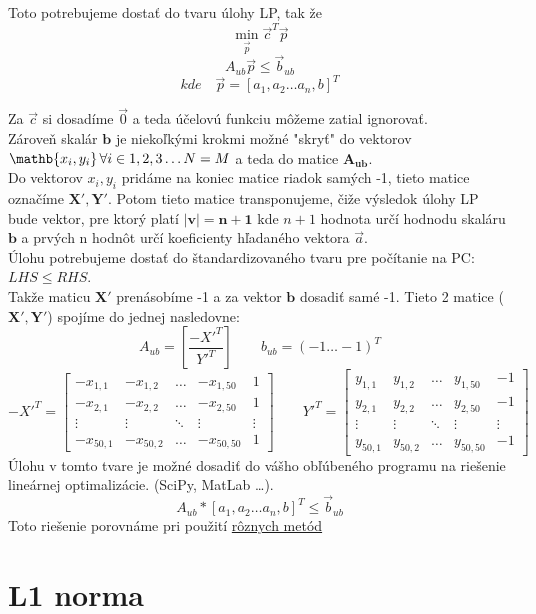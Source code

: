 \documentclass{article}
\begin{document}
Toto potrebujeme dostať do tvaru úlohy LP, tak že
\[\min_{\Vec{p}} \Vec{c} ^ T \Vec{p}\]
\[A_{ub} \Vec{p} \leq \Vec{b}_{ub}\]
\[kde \quad \Vec{p} = [a_1,a_2 \ldots a_{n}, b]^T\]


Za $\Vec{c}$ si dosadíme $\Vec{0}$ a teda účelovú funkciu môžeme zatial ignorovať.
\\
Zároveň skalár $\mathbf{b}$ je niekoľkými krokmi možné "skryť" do  vektorov $\mathb{x_i,\space y_i} \, \forall i \in {1,2,3 \ldots N=M}$ a teda do matice $\mathbf{A_{ub}}$.\\ Do vektorov $x_i, y_i$ pridáme na koniec matice riadok samých -1, tieto matice označíme $\mathbf{X', Y'}$. Potom tieto matice transponujeme, čiže výsledok úlohy LP bude vektor, pre ktorý platí $\mathbf{|v| = n + 1}$ kde $n+1$ hodnota určí hodnodu skaláru $\mathbf{b}$ a prvých n hodnôt určí koeficienty hľadaného vektora $\Vec{a}$.\\


Úlohu potrebujeme dostať do štandardizovaného tvaru pre počítanie na PC: $LHS \leq RHS$.\\
Takže maticu $\mathbf{X'}$ prenásobíme -1 a za vektor $\mathbf{b}$ dosadiť samé -1. Tieto 2 matice ($\mathbf{X', Y'}$) spojíme do jednej nasledovne:
\[A_{ub} = \left[\frac{-X'^T}{Y'^T}\right] \qquad b_{ub} = (-1 \ldots -1)^T\]
\[-X'^T = 
\begin{bmatrix}
-x_{1,1} & -x_{1,2} & \ldots &-x_{1,50} &1\\
-x_{2,1} & -x_{2,2} & \ldots &-x_{2,50} &1\\
\vdots&\vdots &  \ddots & \vdots &  \vdots \\
-x_{50,1} & -x_{50,2} & \ldots& -x_{50,50} &1 
\end{bmatrix}
\qquad
Y'^T=
\begin{bmatrix}
y_{1,1} & y_{1,2} & \ldots &y_{1,50} &-1\\
y_{2,1} & y_{2,2} & \ldots &y_{2,50} &-1\\
\vdots&\vdots &  \ddots & \vdots & \vdots\\
y_{50,1} & y_{50,2} & \ldots& y_{50,50} & -1
\end{bmatrix}
\]
Úlohu v tomto tvare je možné dosadiť do vášho obľúbeného programu na riešenie lineárnej optimalizácie. (SciPy, MatLab \ldots).
\[A_{ub} * [a_1,a_2 \ldots a_{n}, b]^T \leq \Vec{b}_{ub}\]
Toto riešenie porovnáme pri použití  \href{https://github.com/adam-213/LinPro2021/blob/main/Results/ZeroObjectiveFunc.txt}{rôznych metód}


\section{L1 norma}
\end{document}
